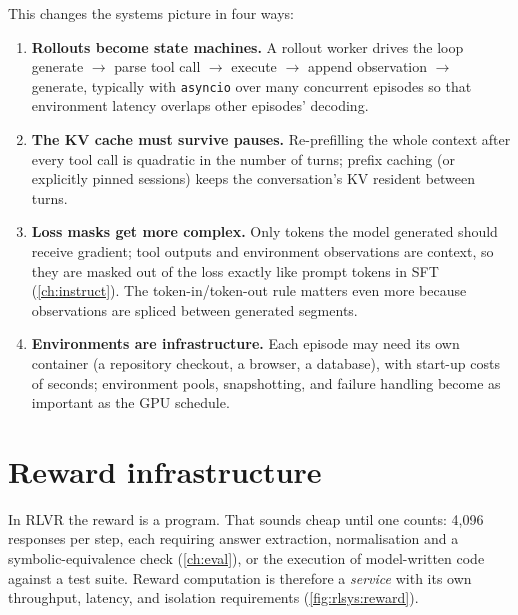 This changes the systems picture in four ways:
\begin{enumerate}
\item \textbf{Rollouts become state machines.} A rollout worker drives the loop
generate $\rightarrow$ parse tool call $\rightarrow$ execute $\rightarrow$ append observation
$\rightarrow$ generate, typically with \texttt{asyncio} over many concurrent episodes so that
environment latency overlaps other episodes' decoding.
\item \textbf{The KV cache must survive pauses.} Re-prefilling the whole context after every
tool call is quadratic in the number of turns; prefix caching (or explicitly pinned sessions)
keeps the conversation's KV resident between turns.
\item \textbf{Loss masks get more complex.} Only tokens the model generated should receive
gradient; tool outputs and environment observations are context, so they are masked out of
the loss exactly like prompt tokens in SFT (\cref{ch:instruct}). The token-in/token-out rule
matters even more because observations are spliced between generated segments.
\item \textbf{Environments are infrastructure.} Each episode may need its own container
(a repository checkout, a browser, a database), with start-up costs of seconds; environment
pools, snapshotting, and failure handling become as important as the GPU schedule.
\end{enumerate}

\section{Reward infrastructure}\label{sec:rlsys:reward}

In RLVR the reward is a program. That sounds cheap until one counts: 4{,}096 responses per
step, each requiring answer extraction, normalisation and a symbolic-equivalence check
(\cref{ch:eval}), or the execution of model-written code against a test suite. Reward
computation is therefore a \emph{service} with its own throughput, latency, and isolation
requirements (\cref{fig:rlsys:reward}).

